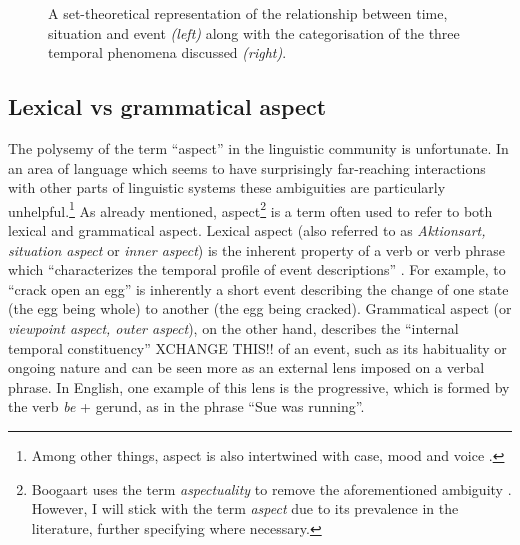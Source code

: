 \begin{figure}
    \hspace{2cm}
    \caption{A set-theoretical representation of the relationship between time, situation and event \emph{(left)} along with the categorisation of the three temporal phenomena discussed \emph{(right)}.}
    \label{fig:TimeSitEvent}
\end{figure}

\subsection{Lexical vs grammatical aspect}
The polysemy of the term “aspect” in the linguistic community is unfortunate. In an area of language which seems to have surprisingly far-reaching interactions with other parts of linguistic systems these ambiguities are particularly unhelpful.\footnote{Among other things, aspect is also intertwined with case, mood and voice \citep{franks2005slavic, Kiparsky2004PartitiveCA}.}
As already mentioned, aspect\footnote{Boogaart uses the term \emph{aspectuality} to remove the aforementioned ambiguity \citep{Boogaart+2004+1165+1180}. However, I will stick with the term \emph{aspect} due to its prevalence in the literature, further specifying where necessary.} is a term often used to refer to both lexical and grammatical aspect. Lexical aspect (also referred to as \emph{Aktionsart, situation aspect} or \emph{inner aspect}) is the inherent property of a verb or verb phrase which “characterizes the temporal profile of event descriptions” \citep{10.1093/oxfordhb/9780199601264.013.25}. For example, to “crack open an egg” is inherently a short event describing the change of one state (the egg being whole) to another (the egg being cracked). Grammatical aspect (or \emph{viewpoint aspect, outer aspect}), on the other hand, describes the “internal temporal constituency” \citep{comrie1976aspect} XCHANGE THIS!! of an event, such as its habituality or ongoing nature and can be seen more as an external lens imposed on a verbal phrase. In English, one example of this lens is the progressive, which is formed by the verb \emph{be} + gerund, as in the phrase “Sue was running”. 

